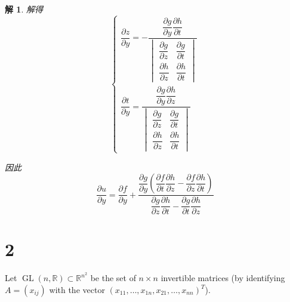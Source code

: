 \documentclass[a4paper,12pt]{article}
\newtheorem*{sol}{解}
\begin{document}
\begin{sol}
    解得
    $$\begin{cases}
            \dfrac{\partial z}{\partial y} = -\dfrac{\dfrac{\partial g}{\partial y}\dfrac{\partial h}{\partial t}}{\begin{vmatrix}
                                                                                                                           \dfrac{\partial g}{\partial z} & \dfrac{\partial g}{\partial t} \\
                                                                                                                           \dfrac{\partial h}{\partial z} & \dfrac{\partial h}{\partial t}
                                                                                                                       \end{vmatrix}} \\[25pt]
            \dfrac{\partial t}{\partial y} = \dfrac{\dfrac{\partial g}{\partial y}\dfrac{\partial h}{\partial z}}{\begin{vmatrix}
                                                                                                                          \dfrac{\partial g}{\partial z} & \dfrac{\partial g}{\partial t} \\
                                                                                                                          \dfrac{\partial h}{\partial z} & \dfrac{\partial h}{\partial t}
                                                                                                                      \end{vmatrix}}
        \end{cases}$$

    因此
    $$\dfrac{\partial u}{\partial y} = \dfrac{\partial f}{\partial y} + \dfrac{\dfrac{\partial g}{\partial y}\left(\dfrac{\partial f}{\partial t}\dfrac{\partial h}{\partial z} - \dfrac{\partial f}{\partial z}\dfrac{\partial h}{\partial t}\right)}{\dfrac{\partial g}{\partial z}\dfrac{\partial h}{\partial t} - \dfrac{\partial g}{\partial t}\dfrac{\partial h}{\partial z}}$$
\end{sol}


\section*{2}

Let $\operatorname{GL}(n,\mathbb{R}) \subset \mathbb{R}^{n^2}$ be the set of $n \times n$ invertible matrices (by identifying $A = (x_{ij})$ with the vector $(x_{11}, \dots, x_{1n}, x_{21}, \dots, x_{nn})^T$).
\end{document}
